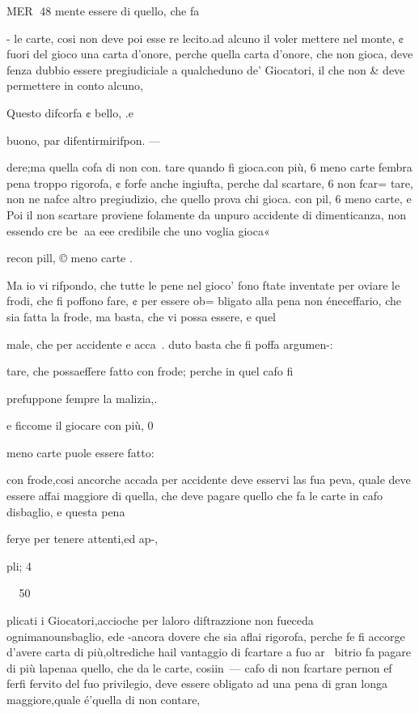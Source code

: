 \documentclass[11pt,a6paper]{article}
\begin{document}
MER
48
mente essere di quello, che fa

- le carte, cosi non deve poi esse
re lecito.ad alcuno il voler mettere nel monte, ¢ fuori del gioco una carta d’onore, perche
quella carta d’onore, che non
gioca, deve fenza dubbio essere
pregiudiciale a qualcheduno
de’ Giocatori, il che non & deve permettere in conto alcuno,

Questo difcorfa ¢ bello, .e

 

buono, par difentirmirifpon. —

dere;ma quella cofa di non con.
tare quando fi gioca.con più, 6
meno carte fembra pena troppo
rigorofa, ¢ forfe anche ingiufta,
perche dal scartare, 6 non fcar=
tare, non ne nafce altro pregiudizio, che quello prova chi
gioca. con pil, 6 meno carte, e
Poi il non scartare proviene folamente da unpuro accidente
di dimenticanza, non essendo
cre
be
aa eee
credibile che uno voglia gioca«

recon pill, © meno carte .

Ma io vi rifpondo, che tutte
le pene nel gioco’ fono ftate inventate per oviare le frodi, che
fi poffono fare, ¢ per essere ob=
bligato alla pena non éneceffario, che sia fatta la frode, ma
basta, che vi possa essere, e quel

male, che per accidente e acca~.
duto basta che fi poffa argumen-:

tare, che possaeffere fatto con
frode; perche in quel cafo fi

prefuppone fempre la malizia,.

e ficcome il giocare con più, 0

meno carte puole essere fatto:

con frode,cosi ancorche accada
per accidente deve esservi las
fua peva, quale deve essere affai maggiore di quella, che deve pagare quello che fa le carte
in cafo disbaglio, e questa pena

ferye per tenere attenti,ed ap-,

pli; 4

~
50

plicati i Giocatori,accioche per
laloro diftrazzione non fueceda ognimanounsbaglio, ede
-ancora dovere che sia aflai rigorofa, perche fe fi accorge d’avere carta di più,oltrediche hail
vantaggio di fcartare a fuo ar~
bitrio fa pagare di più lapenaa
quello, che da le carte, cosiin~—
cafo di non fcartare pernon ef
ferfi fervito del fuo privilegio,
deve essere obligato ad una pena di gran longa maggiore,quale é’quella di non contare,
\end{document}
